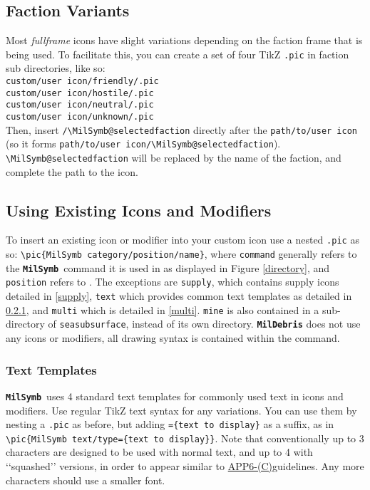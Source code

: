 \documentclass[a4paper, titlepage]{article}
\newcommand\MilSymb{\textbf{\texttt{MilSymb}}}
\newcommand\DocLink{\href{https://www.awl.edu.pl/images/en/APP_6_C.pdf}{APP6-(C)}}
\begin{document}
\subsection{Faction Variants}

Most \textit{fullframe} icons have slight variations depending on the faction frame that is being used. To facilitate this, you can create a set of four TikZ \texttt{.pic} in faction sub directories, like so:\\

\noindent\texttt{custom/user icon/friendly/.pic}\\
\texttt{custom/user icon/hostile/.pic}\\
\texttt{custom/user icon/neutral/.pic}\\
\texttt{custom/user icon/unknown/.pic}\\

Then, insert \texttt{/\textbackslash MilSymb@selectedfaction} directly after the \texttt{path/to/user icon} (so it forms \texttt{path/to/user icon/\textbackslash MilSymb@selectedfaction}). \texttt{\textbackslash MilSymb@selectedfaction} will be replaced by the name of the faction, and complete the path to the icon.

\subsection{Using Existing Icons and Modifiers}

To insert an existing icon or modifier into your custom icon use a nested \texttt{.pic} as so: \texttt{\textbackslash pic\{MilSymb category/position/name\}}, where \texttt{command} generally refers to the \MilSymb\  command it is used in as displayed in Figure \ref{directory}, and \texttt{position} refers to . The exceptions are \texttt{supply}, which contains supply icons detailed in \ref{supply}, \texttt{text} which provides common text templates as detailed in \ref{text}, and \texttt{multi} which is detailed in \ref{multi}. \texttt{mine} is also contained in a sub-directory of \texttt{seasubsurface}, instead of its own directory. \texttt{\textbf{MilDebris}} does not use any icons or modifiers, all drawing syntax is contained within the command.

\subsubsection{Text Templates}
\label{text}

\MilSymb\  uses 4 standard text templates for commonly used text in icons and modifiers. Use regular TikZ text syntax for any variations. You can use them by nesting a \texttt{.pic} as before, but adding \texttt{=\{text to display\}} as a suffix, as in \texttt{\textbackslash pic\{MilSymb text/type=\{text to display\}\}}. Note that conventionally up to 3 characters are designed to be used with normal text, and up to 4 with \lq\lq{}squashed\rq\rq{} versions, in order to appear similar to \DocLink guidelines. Any more characters should use a smaller font.
\end{document}
